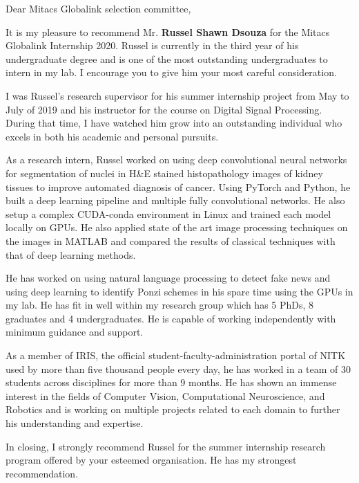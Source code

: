\documentclass[12pt]{article}
\begin{document}
\noindent
Dear Mitacs Globalink selection committee,

\bigskip
\noindent
It is my pleasure to recommend Mr. \textbf{Russel Shawn Dsouza} for the Mitacs Globalink Internship 2020. Russel is currently in the third year of his undergraduate degree and is one of the most outstanding undergraduates to intern in my lab. I encourage you to give him your most careful consideration.

\medskip
\noindent
I was Russel's research supervisor for his summer internship project from May to July of 2019 and his instructor for the course on Digital Signal Processing.
During that time, I have watched him grow into an outstanding individual who excels in both his academic and personal pursuits.

\medskip
\noindent
As a research intern, Russel worked on using deep convolutional neural networks for segmentation of nuclei in H\&E stained histopathology images of kidney tissues to improve automated diagnosis of cancer.
Using PyTorch and Python, he built a deep learning pipeline and multiple fully convolutional networks. He also setup a complex CUDA-conda environment in Linux and trained each model locally on GPUs.
He also applied state of the art image processing techniques on the images in MATLAB and compared the results of classical techniques with that of deep learning methods.

\medskip
\noindent
He has worked on using natural language processing to detect fake news and using deep learning to identify Ponzi schemes in his spare time using the GPUs in my lab.
He has fit in well within my research group which has 5 PhDs, 8 graduates and 4 undergraduates.
He is capable of working independently with minimum guidance and support. 

\medskip
\noindent
As a member of IRIS, the official student-faculty-administration portal of NITK used by more than five thousand people every day, he has worked in a team of 30 students across disciplines for more than 9 months.
He has shown an immense interest in the fields of Computer Vision, Computational Neuroscience, and Robotics and is working on multiple projects related to each domain to further his understanding and expertise.

\medskip
\noindent
In closing, I strongly recommend Russel for the summer internship research program offered by your esteemed organisation. He has my strongest recommendation.
\end{document}
